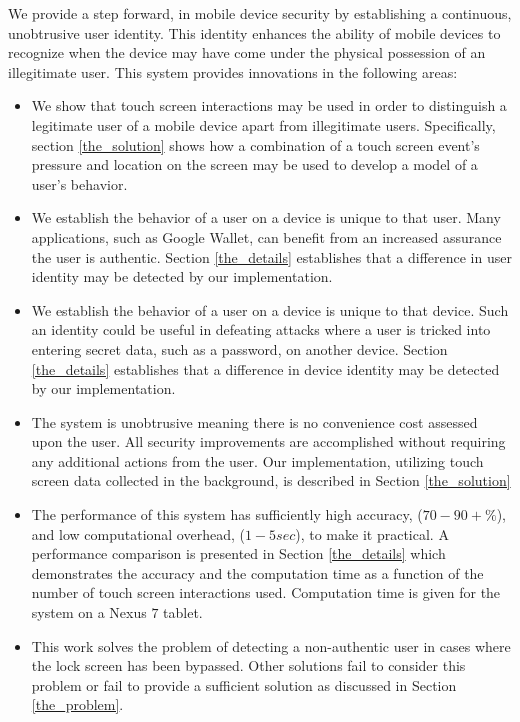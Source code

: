 We provide a step forward, 
%
in mobile device security by
establishing a continuous, unobtrusive user identity.
%
This identity
enhances the ability of mobile devices to
recognize when the 
device may have come under
the physical possession of an illegitimate user.
%
This system provides innovations in the following areas:
\begin{itemize}
\item We show that touch screen interactions may be used in order to
  distinguish a legitimate user of a mobile device apart from
  illegitimate users.
  Specifically, section
  \ref{the_solution} %
  shows how a combination of 
  a touch screen event's 
  pressure and location on the screen
  may be used to develop a model of a user's behavior.
\item We establish the behavior of a user on a device
  is unique to that user.
  Many applications, such as Google Wallet,
  can benefit from an increased
  assurance the user is authentic.
  Section 
  \ref{the_details} %
  establishes that a difference in user identity
  may be detected by our implementation.
\item We establish the behavior of a user on a device
  is unique to that device.
  Such an identity could be useful in defeating
  attacks where a user is tricked into entering
  secret data, such as a password,
  on another device.
  Section 
  \ref{the_details} %
  establishes that a difference in device identity
  may be detected by our implementation.
\item The system is unobtrusive meaning there is no convenience cost assessed upon the user.
  All security improvements are accomplished without requiring any additional
  actions from the user.
  Our implementation,
  utilizing touch screen data collected in the background, 
  is described in
  Section
  \ref{the_solution} %
\item The performance of this system 
  has sufficiently high accuracy, ($70-90+\%$), and
  low computational overhead, ($1-5 sec$),
  to make it practical.
  A performance comparison is presented in Section
  \ref{the_details} %
  which demonstrates 
  the accuracy and
  the computation time as a function of
  the number of touch screen interactions used.
  Computation time is given for
  the system on a Nexus $7$ tablet.
\item This work solves the problem of
  detecting a non-authentic user
  in cases where the lock screen has been bypassed. %
  Other solutions fail to consider this problem
  or fail to provide a sufficient solution
  as discussed in 
  Section \ref{the_problem}.
\end{itemize}

